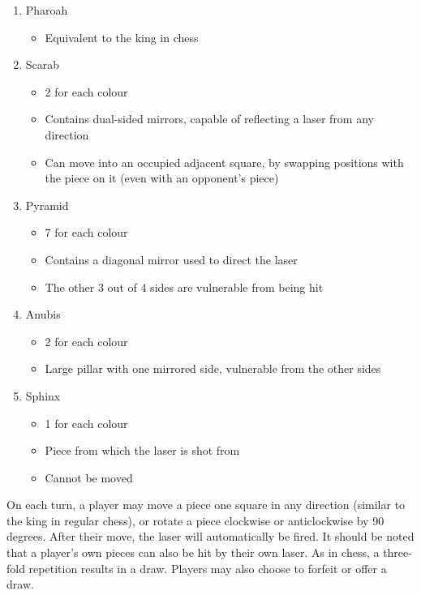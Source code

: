 \documentclass[../main/main.tex]{subfiles}
\begin{document}
\begin{enumerate}
\item Pharoah
    \begin{itemize}[label=\hyp{}]
    \item Equivalent to the king in chess
    \end{itemize}
\item Scarab
    \begin{itemize}[label=\hyp{}]
    \item 2 for each colour
    \item Contains dual-sided mirrors, capable of reflecting a laser from any direction
    \item Can move into an occupied adjacent square, by swapping positions with the piece on it (even with an opponent’s piece)
    \end{itemize}
\item Pyramid
    \begin{itemize}[label=\hyp{}]
    \item 7 for each colour
    \item Contains a diagonal mirror used to direct the laser
    \item The other 3 out of 4 sides are vulnerable from being hit
    \end{itemize}
\item Anubis
    \begin{itemize}[label=\hyp{}]
    \item 2 for each colour
    \item Large pillar with one mirrored side, vulnerable from the other sides
    \end{itemize}
\item Sphinx
    \begin{itemize}[label=\hyp{}]
    \item 1 for each colour
    \item Piece from which the laser is shot from
    \item Cannot be moved
    \end{itemize}
\end{enumerate}

On each turn, a player may move a piece one square in any direction (similar to the king in regular chess), or rotate a piece clockwise or anticlockwise by 90 degrees. After their move, the laser will automatically be fired. It should be noted that a player’s own pieces can also be hit by their own laser. As in chess, a three-fold repetition results in a draw. Players may also choose to forfeit or offer a draw.
\end{document}
